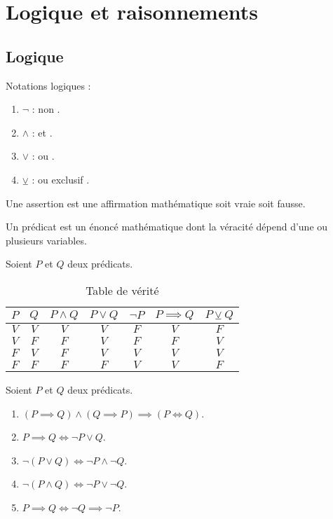 \chapter{Logique et raisonnements}

\section{Logique}
\noindent Notations logiques :
\begin{enumerate}
	\item $\neg$ : \og non \fg.
	\item $\land$ : \og et \fg.
	\item $\lor$ : \og ou \fg.
	\item $\veebar$ : \og ou exclusif \fg.
\end{enumerate}

\begin{definition}[Assertion]
  Une assertion est une affirmation mathématique soit vraie soit fausse.
\end{definition}

\begin{definition}[Prédicat]
  Un prédicat est un énoncé mathématique dont la véracité dépend d'une ou plusieurs variables.
\end{definition}

Soient $P$ et $Q$ deux prédicats.
\begin{table}[!h]
	\centering
	\begin{tabular}{ccccccc}
		\toprule
		$P$ & $Q$ & $P \land Q$ & $P \lor Q$ & $\neg P$ & $P \implies Q$ & $P \veebar Q$ \\
		\midrule
		$V$ & $V$ & $V$ & $V$ & $F$ & $V$ & $F$ \\
		$V$ & $F$ & $F$ & $V$ & $F$ & $F$ & $V$ \\
		$F$ & $V$ & $F$ & $V$ & $V$ & $V$ & $V$ \\
		$F$ & $F$ & $F$ & $F$ & $V$ & $V$ & $F$ \\
		\bottomrule
	\end{tabular}
	\caption{Table de vérité}
\end{table}

\begin{proposition}
  Soient $P$ et $Q$ deux prédicats.  
	\begin{enumerate} 
		\item $(P \implies Q) \land (Q \implies P) \implies (P \iff Q)$.
		\item $P \implies Q \iff \neg P \lor Q$.
		\item $\neg (P \lor Q) \iff \neg P \land \neg Q$.
		\item $\neg (P \land Q) \iff \neg P \lor \neg Q$.
		\item $P \implies Q \iff \neg Q \implies \neg P$.
	\end{enumerate}
\end{proposition}

